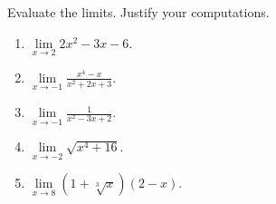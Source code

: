 Evaluate the limits. Justify your computations.
\begin{multicols}{3}
\begin{enumerate}
\item $\displaystyle\lim\limits_{x\to 2} 2x^2-3x-6$.
\item $\displaystyle\lim\limits_{x\to -1} \frac{x^4-x}{x^2+2x+3}$.
\item $\displaystyle\lim\limits_{x\to -1} \frac{1}{x^2 -3x +2} $.
\item $\displaystyle\lim\limits_{x\to -2}\sqrt{x^4+16}$.
\item $\displaystyle\lim\limits_{x \to 8}(1+ \sqrt[3]{x} )(2-  x)$.
\end{enumerate}
\end{multicols}
